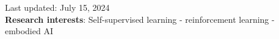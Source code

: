 \documentclass[A4,11pt]{article}
\begin{document}

\section{}
Last updated: July 15, 2024 \\
\textbf{Research interests}: Self-supervised learning -  reinforcement learning - embodied AI
\end{document}
